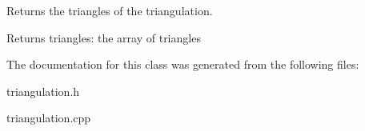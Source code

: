 Returns the triangles of the triangulation. 

\begin{DoxyReturn}{Returns}
triangles\+: the array of triangles 
\end{DoxyReturn}


The documentation for this class was generated from the following files\+:\begin{DoxyCompactItemize}
\item 
triangulation.\+h\item 
triangulation.\+cpp\end{DoxyCompactItemize}
